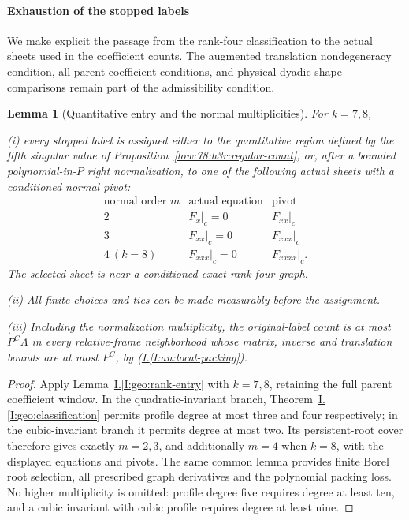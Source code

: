 \documentclass[11pt]{amsart}
\newtheorem{lemma}[theorem]{Lemma}
\theoremstyle{definition}
\theoremstyle{remark}
\numberwithin{equation}{section}
\newcommand{\partIref}[1]{\hyperref[I:#1]{I.\ref*{I:#1}}}
\newcommand{\partIeqref}[1]{\textup{(\partIref{#1})}}
\begin{document}
\paragraph{Exhaustion of the stopped labels}

We make explicit the passage from the rank-four classification to the actual sheets used in the coefficient counts. The augmented translation nondegeneracy condition, all parent coefficient conditions, and physical dyadic shape comparisons remain part of the admissibility condition. 

\begin{lemma}[Quantitative entry and the normal multiplicities]\label{low:78:s78:entry}
For $k=7,8$,

\noindent\textup{(i)} every stopped label is assigned either to the quantitative region defined by the fifth singular value of Proposition~\ref{low:78:h3r:regular-count}, or, after a bounded polynomial-in-$P$ right normalization, to one of the following actual sheets with a conditioned normal pivot:
\[
\begin{array}{c|c|c}
\text{normal order }m&\text{actual equation}&\text{pivot}\\\hline
2&F_x|_c=0&F_{xx}|_c\\
3&F_{xx}|_c=0&F_{xxx}|_c\\
4\ (k=8)&F_{xxx}|_c=0&F_{xxxx}|_c.
\end{array}
\]
The selected sheet is near a conditioned exact rank-four graph.

\noindent\textup{(ii)} All finite choices and ties can be made measurably before the assignment.

\noindent\textup{(iii)} Including the normalization multiplicity, the original-label count is at most $P^C\Lambda$ in every relative-frame neighborhood whose matrix, inverse and translation bounds are at most $P^C$, by \partIeqref{an:local-packing}.
\end{lemma}
\begin{proof}
Apply Lemma~\partIref{geo:rank-entry} with $k=7,8$, retaining the full parent coefficient window. In the quadratic-invariant branch, Theorem~\partIref{geo:classification} permits profile degree at most three and four respectively; in the cubic-invariant branch it permits degree at most two. Its persistent-root cover therefore gives exactly $m=2,3$, and additionally $m=4$ when $k=8$, with the displayed equations and pivots. The same common lemma provides finite Borel root selection, all prescribed graph derivatives and the polynomial packing loss. No higher multiplicity is omitted: profile degree five requires degree at least ten, and a cubic invariant with cubic profile requires degree at least nine.
\end{proof}
\end{document}
